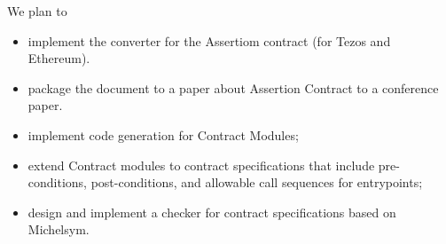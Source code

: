 \documentclass[a4paper,11pt]{article}
\begin{document}
We plan to 
\begin{itemize}
\item implement the converter for the Assertiom contract (for Tezos and Ethereum). 
\item package the document to a paper about Assertion Contract to a conference paper.
\item implement code generation for Contract Modules; 
\item extend Contract modules to contract specifications that include pre-conditions, post-conditions, and allowable call sequences for entrypoints; 
\item design and implement a checker for contract specifications based on Michelsym.
\end{itemize}





\end{document}

